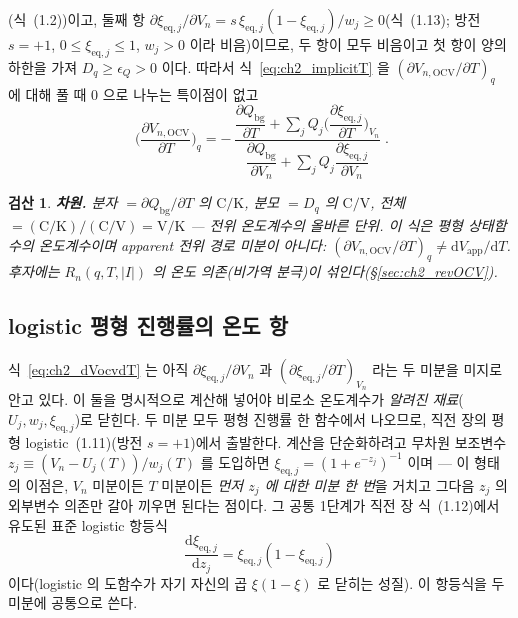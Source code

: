 \documentclass[11pt,a4paper]{article}
\newtheorem*{verifybox}{검산}
\newcommand{\dd}{\mathrm{d}}
\newcommand{\eq}{\mathrm{eq}}
\newcommand{\app}{\mathrm{app}}
\newcommand{\bg}{\mathrm{bg}}
\newcommand{\OCV}{\mathrm{OCV}}
\begin{document}
(식~(1.2))이고, 둘째 항 $\partial\xi_{\eq,j}/\partial V_n=s\,\xi_{\eq,j}(1-\xi_{\eq,j})/w_j\ge0$(식~(1.13);
방전 $s=+1$, $0\le\xi_{\eq,j}\le1$, $w_j>0$ 이라 비음)이므로, 두 항이 모두 비음이고 첫 항이 양의 하한을 가져
$D_q\ge\epsilon_Q>0$ 이다. 따라서 식~\eqref{eq:ch2_implicitT} 을 $(\partial V_{n,\OCV}/\partial T)_q$ 에 대해
풀 때 $0$ 으로 나누는 특이점이 없고
\begin{equation}
\boxed{\;\Big(\frac{\partial V_{n,\OCV}}{\partial T}\Big)_q
=-\,\frac{\dfrac{\partial Q_\bg}{\partial T}+\displaystyle\sum_{j}Q_{j}\Big(\dfrac{\partial\xi_{\eq,j}}{\partial T}\Big)_{V_n}}
{\dfrac{\partial Q_\bg}{\partial V_n}+\displaystyle\sum_{j}Q_{j}\dfrac{\partial\xi_{\eq,j}}{\partial V_n}}\;.}
\label{eq:ch2_dVocvdT}
\end{equation}

\begin{verifybox}
\textbf{차원.} 분자 $=\partial Q_\bg/\partial T$ 의 $\mathrm{C/K}$, 분모 $=D_q$ 의 $\mathrm{C/V}$, 전체
$=(\mathrm{C/K})/(\mathrm{C/V})=\mathrm{V/K}$ — 전위 온도계수의 올바른 단위. 이 식은 \emph{평형} 상태함수의
온도계수이며 apparent 전위 경로 미분이 아니다: $(\partial V_{n,\OCV}/\partial T)_q\ne\dd V_\app/\dd T$. 후자에는
$R_n(q,T,|I|)$ 의 온도 의존(비가역 분극)이 섞인다(\S\ref{sec:ch2_revOCV}).
\end{verifybox}

\subsection{logistic 평형 진행률의 온도 항}
식~\eqref{eq:ch2_dVocvdT} 는 아직 $\partial\xi_{\eq,j}/\partial V_n$ 과 $(\partial\xi_{\eq,j}/\partial T)_{V_n}$ 라는
두 미분을 미지로 안고 있다. 이 둘을 명시적으로 계산해 넣어야 비로소 온도계수가 \emph{알려진 재료}($U_j,w_j,\xi_{\eq,j}$)로
닫힌다. 두 미분 모두 평형 진행률 한 함수에서 나오므로, 직전 장의 평형 logistic~(1.11)(방전 $s=+1$)에서 출발한다.
계산을 단순화하려고 무차원 보조변수 $z_j\equiv(V_n-U_j(T))/w_j(T)$ 를 도입하면 $\xi_{\eq,j}=(1+e^{-z_j})^{-1}$
이며 — 이 형태의 이점은, $V_n$ 미분이든 $T$ 미분이든 \emph{먼저 $z_j$ 에 대한 미분 한 번}을 거치고 그다음
$z_j$ 의 외부변수 의존만 갈아 끼우면 된다는 점이다. 그 공통 1단계가 직전 장 식~(1.12)에서 유도된 표준 logistic
항등식
\begin{equation}
\frac{\dd\xi_{\eq,j}}{\dd z_j}=\xi_{\eq,j}(1-\xi_{\eq,j})
\label{eq:ch2_logistic_id}
\end{equation}
이다(logistic 의 도함수가 자기 자신의 곱 $\xi(1-\xi)$ 로 닫히는 성질). 이 항등식을 두 미분에 공통으로 쓴다.
\end{document}
